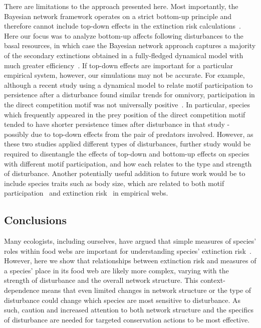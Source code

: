 \documentclass[12pt]{article}
\begin{document}
\begin{spacing}{2.0}
    There are limitations to the approach presented here.
    Most importantly, the Bayesian network framework operates on a strict bottom-up principle and therefore cannot include top-down effects in the extinction risk calculations~\citep{Eklof2013}. 
    Here our focus was to analyze bottom-up affects following disturbances to the basal resources, in which case the Bayesian network approach captures a majority of the secondary extinctions obtained in a fully-fledged dynamical model with much greater efficiency~\citep{Eklof2013}.
    If top-down effects are important for a particular empirical system, however, our simulations may not be accurate. 
    For example, although a recent study using a dynamical model to relate motif participation to persistence after a disturbance found similar trends for omnivory, participation in the direct competition motif was not universally positive~\citep{Cirtwill2022Oikos}.
    In particular, species which frequently appeared in the prey position of the direct competition motif tended to have shorter persistence times after disturbance in that study - possibly due to top-down effects from the pair of predators involved.
    However, as these two studies applied different types of disturbances, further study would be required to disentangle the effects of top-down and bottom-up effects on species with different motif participation, and how each relates to the type and strength of disturbance.
    Another potentially useful addition to future work would be to include species traits such as body size, which are related to both motif participation~\citep{cirtwill2018feeding} and extinction risk~\citep{Brose2017,Cardillo2005,Purvis2000} in empirical webs.
    
    
    \subsection*{Conclusions}
    
    Many ecologists, including ourselves, have argued that simple measures of species' roles within food webs are important for understanding species' extinction risk~\citep{Santos2021,dunne2009cascading, Eklof2006,binzer2011susceptibility}. 
    However, here we show that relationships between extinction risk and measures of a species' place in its food web are likely more complex, varying with the strength of disturbance and the overall network structure.
    This context-dependence means that even limited changes in network structure or the type of disturbance could change which species are most sensitive to disturbance. 
    As such, caution and increased attention to both network structure and the specifics of disturbance are needed for targeted conservation actions to be most effective. 
    

\end{spacing}
\end{document}
